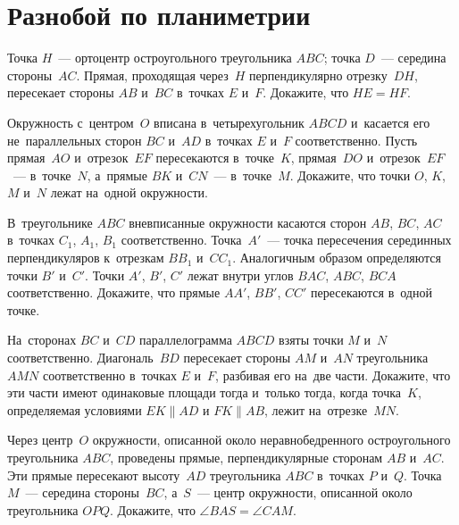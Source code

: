 
\section*{Разнобой по планиметрии}


\begin{problems}

\item
Точка $H$~--- ортоцентр остроугольного треугольника $ABC$;
точка $D$~--- середина стороны~$AC$.
Прямая, проходящая через~$H$ перпендикулярно отрезку~$DH$, пересекает стороны
$AB$ и~$BC$ в~точках $E$ и~$F$.
Докажите, что $HE = HF$.

\item
Окружность с~центром~$O$ вписана в~четырехугольник $ABCD$ и~касается его
не~параллельных сторон $BC$ и~$AD$ в~точках $E$ и~$F$ соответственно.
Пусть прямая~$AO$ и~отрезок~$EF$ пересекаются в~точке~$K$, прямая~$DO$
и~отрезок~$EF$~--- в~точке~$N$, а~прямые $BK$ и~$CN$~--- в~точке~$M$.
Докажите, что точки $O$, $K$, $M$ и~$N$ лежат на~одной окружности.

\item
В~треугольнике $ABC$ вневписанные окружности касаются сторон $AB$, $BC$, $AC$
в~точках $C_1$, $A_1$, $B_1$ соответственно.
Точка~$A'$~--- точка пересечения серединных перпендикуляров к~отрезкам
$B B_1$ и~$C C_1$.
Аналогичным образом определяются точки $B'$ и~$C'$.
Точки $A'$, $B'$, $C'$ лежат внутри углов $BAC$, $ABC$, $BCA$ соответственно.
Докажите, что прямые $AA'$, $BB'$, $CC'$ пересекаются в~одной точке.

\item
На~сторонах $BC$ и~$CD$ параллелограмма $ABCD$ взяты точки $M$ и~$N$
соответственно.
Диагональ~$BD$ пересекает стороны $AM$ и~$AN$ треугольника $AMN$ соответственно
в~точках $E$ и~$F$, разбивая его на~две части.
Докажите, что эти части имеют одинаковые площади тогда и~только тогда, когда
точка~$K$, определяемая условиями $EK \parallel AD$ и $FK \parallel AB$, лежит
на~отрезке~$MN$.

\item
Через центр~$O$ окружности, описанной около неравнобедренного остроугольного
треугольника $ABC$, проведены прямые, перпендикулярные сторонам $AB$ и~$AC$.
Эти прямые пересекают высоту~$AD$ треугольника $ABC$ в~точках $P$ и~$Q$.
Точка~$M$~--- середина стороны~$BC$, а~$S$~--- центр окружности, описанной
около треугольника $OPQ$.
Докажите, что $\angle BAS = \angle CAM$.


\end{problems}

